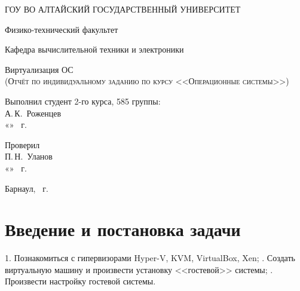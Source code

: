 \documentclass[a4paper,14pt]{extarticle}
\begin{document}
\begin{titlepage}
  \begin{center}
    ГОУ ВО АЛТАЙСКИЙ ГОСУДАРСТВЕННЫЙ УНИВЕРСИТЕТ
    \vspace{0.25cm}
    
    Физико-технический факультет
    
    Кафедра вычислительной техники и электроники
    \vfill
    
    {\LARGE Виртуализация ОС}\\[5mm]
    \textsc{(Отчёт по индивидуальному заданию по курсу <<Операционные системы>>)}
  \bigskip

\end{center}
\vfill

\newlength{\ML}
\hfill\begin{minipage}{0.4\textwidth}
  Выполнил студент 2-го курса, 585 группы:\\
  \underline{\hspace{\ML}} А.\,К.~Роженцев\\
  «\underline{\hspace{0.7cm}}» \underline{\hspace{2cm}} \the\year~г.
\end{minipage}%
\bigskip

\hfill\begin{minipage}{0.4\textwidth}
  Проверил\\
  \underline{\hspace{\ML}} П.\,Н.~Уланов\\
  «\underline{\hspace{0.7cm}}» \underline{\hspace{2cm}} \the\year~г.
\end{minipage}%
\vfill

\begin{center}
  Барнаул, \the\year~г.
\end{center}
\end{titlepage}


\tableofcontents

\section{Введение и постановка задачи}
1. Познакомиться с гипервизорами Hyper-V, KVM, VirtualBox, Xen;
. Создать виртуальную машину и произвести установку <<гостевой>> системы;
. Произвести настройку гостевой системы.
\newline
\end{document}
